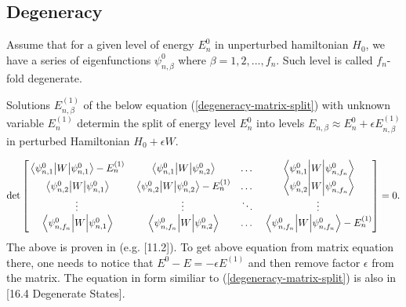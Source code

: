 \documentclass[main.tex]{subfiles}
\begin{document}
\subsection{Degeneracy}
Assume that for a given level of energy $E^0_n$ in unperturbed hamiltonian $H_0$, we have a series of eigenfunctions $\psi^0_{n,\beta}$ where $\beta=1,2, ..., f_n$. Such level is called $f_n$-fold degenerate.

Solutions $E_{n,\beta}^{(1)}$ of the below equation (\ref{degeneracy-matrix-split}) with unknown variable $E^{(1)}_n$ determin the split of energy level $E^0_n$ into levels $E_{n,\beta} \approx E_n^0 + \epsilon E^{(1)}_{n,\beta} $ in perturbed Hamiltonian $H_0 + \epsilon W$. 

\begin{equation}
\label{degeneracy-matrix-split}
\det\begin{bmatrix}
    \mel{\psi^0_{n,1}}{W}{\psi^0_{n,1}} - E_n^{(1)} & \mel{\psi^0_{n,1}}{W}{\psi^0_{n,2}} & \dots  & \mel{\psi^0_{n,1}}{W}{\psi^0_{n,f_n}}\\
    \mel{\psi^0_{n,2}}{W}{\psi^0_{n,1}} &  \mel{\psi^0_{n,2}}{W}{\psi^0_{n,2}} - E_n^{(1)} & \dots  & \mel{\psi^0_{n,2}}{W}{\psi^0_{n,f_n}} \\
    \vdots & \vdots & \ddots & \vdots \\
    \mel{\psi^0_{n,f_n}}{W}{\psi^0_{n,1}} & \mel{\psi^0_{n,f_n}}{W}{\psi^0_{n,2}} & \dots  & \mel{\psi^0_{n,f_n}}{W}{\psi^0_{n,f_n}} - E_n^{(1)}
\end{bmatrix} = 0.
\end{equation}
The above is proven in (e.g. \cite{walter-greiner2001}[11.2]). To get above equation from matrix equation there, one needs to notice that $E^0 - E = -\epsilon E^{(1)}$ and then remove factor $\epsilon$ from the matrix. The equation in form similiar to (\ref{degeneracy-matrix-split}) is also in \cite{desai2010}[16.4 Degenerate States].
\end{document}

